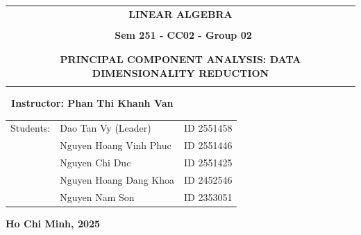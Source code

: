 \documentclass[12pt, a4paper]{report}
\begin{document}
\begin{titlepage}
    \vspace{5pt}
    \begin{center}
        \begin{tabular}{c}
          \textbf{\Huge LINEAR ALGEBRA}         \\
          \\
           \textbf{\ Sem 251  - CC02 - Group 02}          \\
          {}                                             \\
          \midrule                    
          \\
         \textbf{\normalsize
        \parbox{13cm}{\centering PRINCIPAL COMPONENT ANALYSIS: DATA DIMENSIONALITY REDUCTION}
        }
        \\
          {}                                           \\
          \bottomrule
        \end{tabular}
    \end{center}

    \vspace{0.1cm}
    \begin{center}
        \textbf{\ Instructor: Phan Thi Khanh Van}   
    \end{center}

    \begin{table}[h]
        \begin{tabular}{rll}
            \hspace{3cm}Students: & Dao Tan Vy (Leader) & ID 2551458 \\
                                  & Nguyen Hoang Vinh Phuc & ID 2551446 \\
                                  & Nguyen Chi Duc & ID 2551425 \\
                                  & Nguyen Hoang Dang Khoa & ID 2452546 \\
                                  & Nguyen Nam Son & ID 2353051 \\
        \end{tabular}
    \end{table}

    \vspace{0cm}
    \begin{center}
        \textbf{Ho Chi Minh, 2025}
    \end{center}
\end{titlepage}

\tableofcontents
\end{document}
